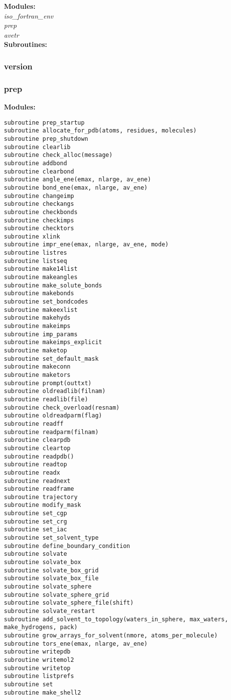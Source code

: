\documentclass[10pt, oneside, pdftex]{article}
\begin{document}
\textbf{Modules: }\\
\textit{iso\_fortran\_env}\\
\textit{prep}\\
\textit{avetr}\\


\textbf{Subroutines: }\\


\subsubsection{version} 
\subsubsection{prep}
\textbf{Modules: }\\
\textit{}



\begin{Verbatim}
subroutine prep_startup
subroutine allocate_for_pdb(atoms, residues, molecules)
subroutine prep_shutdown
subroutine clearlib
subroutine check_alloc(message)
subroutine addbond
subroutine clearbond
subroutine angle_ene(emax, nlarge, av_ene)
subroutine bond_ene(emax, nlarge, av_ene)
subroutine changeimp
subroutine checkangs
subroutine checkbonds
subroutine checkimps
subroutine checktors
subroutine xlink
subroutine impr_ene(emax, nlarge, av_ene, mode)
subroutine listres
subroutine listseq
subroutine make14list
subroutine makeangles
subroutine make_solute_bonds
subroutine makebonds
subroutine set_bondcodes
subroutine makeexlist
subroutine makehyds
subroutine makeimps
subroutine imp_params
subroutine makeimps_explicit
subroutine maketop
subroutine set_default_mask
subroutine makeconn
subroutine maketors
subroutine prompt(outtxt)
subroutine oldreadlib(filnam)
subroutine readlib(file)
subroutine check_overload(resnam)
subroutine oldreadparm(flag)
subroutine readff
subroutine readparm(filnam)
subroutine clearpdb
subroutine cleartop
subroutine readpdb()
subroutine readtop
subroutine readx
subroutine readnext
subroutine readframe
subroutine trajectory
subroutine modify_mask
subroutine set_cgp
subroutine set_crg
subroutine set_iac
subroutine set_solvent_type
subroutine define_boundary_condition
subroutine solvate
subroutine solvate_box
subroutine solvate_box_grid
subroutine solvate_box_file
subroutine solvate_sphere
subroutine solvate_sphere_grid
subroutine solvate_sphere_file(shift)
subroutine solvate_restart
subroutine add_solvent_to_topology(waters_in_sphere, max_waters,
make_hydrogens, pack)
subroutine grow_arrays_for_solvent(nmore, atoms_per_molecule)
subroutine tors_ene(emax, nlarge, av_ene)
subroutine writepdb
subroutine writemol2
subroutine writetop
subroutine listprefs
subroutine set
subroutine make_shell2
\end{Verbatim}
 
\end{document}
